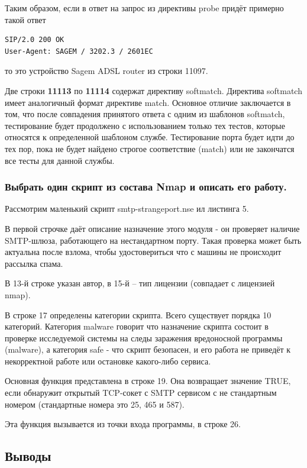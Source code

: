 \documentclass[a4paper, 12pt]{article}		%
\begin{document}
Таким образом, если в ответ на запрос из директивы probe придёт примерно такой ответ
\begin{Verbatim}[frame=single]
SIP/2.0 200 OK
User-Agent: SAGEM / 3202.3 / 2601EC
\end{Verbatim}
то это устройство Sagem ADSL router из строки 11097.

Две строки \textbf{11113} по \textbf{11114} содержат директиву softmatch. Директива softmatch имеет аналогичный формат директиве match. Основное отличие заключается в том, что после совпадения принятого ответа с одним из шаблонов softmatch, тестирование будет продолжено с использованием только тех тестов, которые относятся к определенной шаблоном службе. Тестирование порта будет идти до тех пор, пока не будет найдено строгое соответствие (match) или не закончатся все тесты для данной службы.

\subsubsection{Выбрать один скрипт из состава Nmap и описать его работу.}

Рассмотрим маленький скрипт smtp-strangeport.nse ил листинга 5.



В первой строчке даёт описание назначение этого модуля - он проверяет наличие SMTP-шлюза, работающего на нестандартном порту. Такая проверка может быть актуальна после взлома, чтобы удостовериться что с машины не происходит рассылка спама.

В 13-й строке указан автор, в 15-й -- тип лицензии (совпадает с лицензией nmap).

В строке 17 определены категории скрипта. Всего существует порядка 10 категорий. Категория malware говорит что назначение скрипта состоит в проверке исследуемой системы на следы заражения вредоносной программы (malware), а категория safe - что скрипт безопасен, и его работа не приведёт к некорректной работе или остановке какого-либо сервиса.

Основная функция представлена в строке 19. Она возвращает значение TRUE, если обнаружит открытый TCP-сокет с SMTP сервисом с не стандартным номером (стандартные номера это 25, 465 и 587).

Эта функция вызывается из точки входа программы, в строке 26.

\subsection{Выводы}
\end{document}

